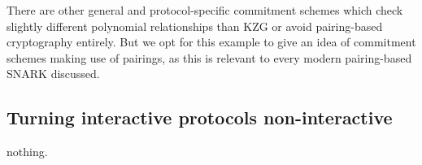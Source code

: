 \noindent There are other general and protocol-specific commitment schemes which check slightly different polynomial relationships than KZG or avoid pairing-based cryptography entirely. But we opt for this example to give an idea of commitment schemes making use of pairings, as this is relevant to every modern pairing-based SNARK discussed.

\subsection{Turning interactive protocols non-interactive}
\noindent nothing.
